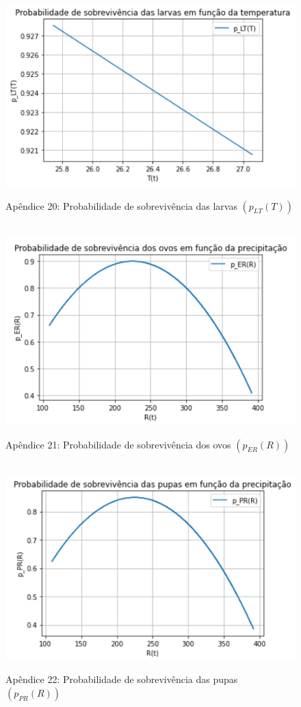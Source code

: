 \documentclass[12pt]{article}
\begin{document}
\begin{figure}[!ht]
        \centering
        \hbox{\hspace{2.5em} \includegraphics[scale=1.0] {Plot_p_LT(T)_corrigido.png}}
        \caption*{Apêndice 20: Probabilidade de sobrevivência das larvas $(p_{LT}(T))$} 
\end{figure} 
\newpage
\begin{figure}[!ht]
        \centering
        \hbox{\hspace{3.0em} \includegraphics[scale=1.0] {Plot_p_ER(R).png}}
        \caption*{Apêndice 21: Probabilidade de sobrevivência dos ovos $(p_{ER}(R))$} 
\end{figure} 
\begin{figure}[!ht]
        \centering
        \hbox{\hspace{2.5em} \includegraphics[scale=1.0] {Plot_p_PR(R).png}}
        \caption*{Apêndice 22: Probabilidade de sobrevivência das pupas $(p_{PR}(R))$} 
\end{figure} 
\end{document}
